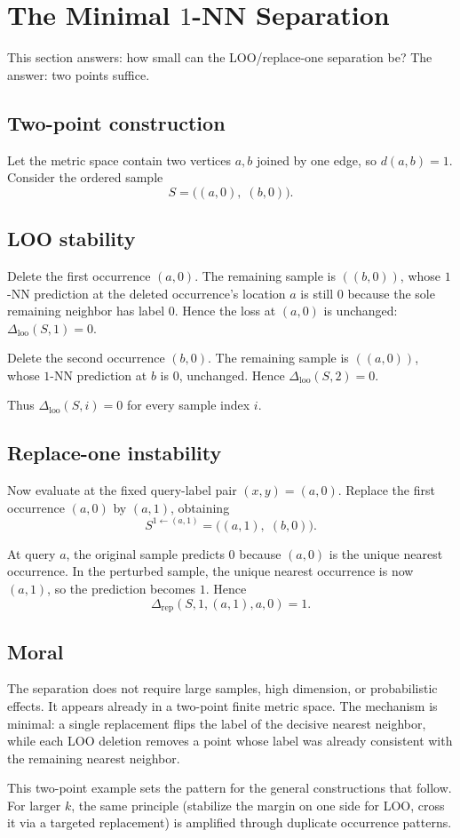 \section{The Minimal $1$-NN Separation}
\label{sec:minimal-1nn}

This section answers: how small can the LOO/replace-one separation be?  The
answer: two points suffice.

\subsection{Two-point construction}

Let the metric space contain two vertices $a,b$ joined by one edge, so
$d(a,b)=1$.  Consider the ordered sample
\[
S = \big((a,0),\;(b,0)\big).
\]

\subsection{LOO stability}

Delete the first occurrence $(a,0)$.  The remaining sample is $((b,0))$, whose
$1$-NN prediction at the deleted occurrence's location $a$ is still $0$ because
the sole remaining neighbor has label $0$.  Hence the loss at $(a,0)$ is
unchanged: $\Delta_{\mathrm{loo}}(S,1)=0$.

Delete the second occurrence $(b,0)$.  The remaining sample is $((a,0))$, whose
$1$-NN prediction at $b$ is $0$, unchanged.  Hence
$\Delta_{\mathrm{loo}}(S,2)=0$.

Thus $\Delta_{\mathrm{loo}}(S,i)=0$ for every sample index $i$.

\subsection{Replace-one instability}

Now evaluate at the fixed query-label pair $(x,y)=(a,0)$.  Replace the first
occurrence $(a,0)$ by $(a,1)$, obtaining
\[
S^{1 \leftarrow (a,1)} = \big((a,1),\;(b,0)\big).
\]

At query $a$, the original sample predicts $0$ because $(a,0)$ is the unique
nearest occurrence.  In the perturbed sample, the unique nearest occurrence is
now $(a,1)$, so the prediction becomes $1$.  Hence
\[
\Delta_{\mathrm{rep}}(S, 1, (a,1), a, 0) = 1.
\]

\subsection{Moral}

The separation does not require large samples, high dimension, or probabilistic
effects.  It appears already in a two-point finite metric space.  The
mechanism is minimal: a single replacement flips the label of the decisive
nearest neighbor, while each LOO deletion removes a point whose label was
already consistent with the remaining nearest neighbor.

This two-point example sets the pattern for the general constructions that
follow.  For larger $k$, the same principle (stabilize the margin on one side
for LOO, cross it via a targeted replacement) is amplified through duplicate
occurrence patterns.

